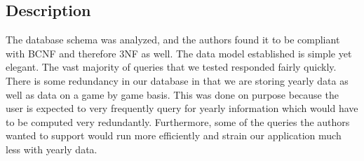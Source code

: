 \documentclass[12pt,letterpaper]{article}
\begin{document}
\subsection{Description}
The database schema was analyzed, and the authors found it to be compliant with BCNF and therefore 3NF as well. The data model established is simple yet elegant. The vast majority of queries that we tested responded fairly quickly.\\ 
There is some redundancy in our database in that we are storing yearly data as well as data on a game by game basis. This was done on purpose because the user is expected to very frequently query for yearly information which would have to be computed very redundantly. Furthermore, some of the queries the authors wanted to support would run more efficiently and strain our application much less with yearly data.\\
\end{document}
